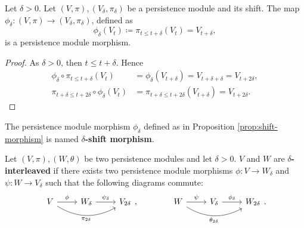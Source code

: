\begin{proposition} \label{prop:shift-morphism}
    Let $ \delta > 0 $. Let $(V, \pi), (V_\delta, \pi_\delta) $ be a persistence module and its shift. The map $ \phi_\delta \colon (V, \pi) \to (V_\delta, \pi_\delta) $, defined as
    \begin{equation}
        \phi_\delta (V_t) \coloneq \pi_{t \leq t + \delta}(V_t) = V_{t+\delta},
    \end{equation}
    is a persistence module morphism.
\end{proposition}
\begin{proof}
    As $ \delta > 0 $, then $ t \leq t+\delta $. Hence
    \begin{align}
        \phi_\delta \circ \pi_{t \leq t+\delta} (V_t) &= \phi_\delta (V_{t+\delta}) = V_{t+\delta+\delta} = V_{t+2 \delta}, \\
        \pi_{t+\delta \leq t+2\delta} \circ \phi_\delta (V_t) &= \pi_{t+\delta \leq t+2\delta}(V_{t+\delta}) = V_{t+2 \delta}.
    \end{align}
\end{proof}

\begin{definition}
    The persistence module morphism $ \phi_\delta $ defined as in Proposition \ref{prop:shift-morphism} is named {\bf $\delta$-shift morphism}.
\end{definition}

\begin{definition} \label{def:interleaved-modules}
    Let $ (V, \pi), (W, \theta) $ be two persistence modules and let $ \delta > 0 $. $ V $ and $ W $ are {\bf $\delta$-interleaved } if there exists two persistence module morphisms $ \phi \colon V \to W_\delta $ and $ \psi \colon W \to V_\delta $ such that the following diagrams commute:
    \begin{equation}
        \begin{array}{ccc}
        \begin{tikzcd}
            V \arrow[r, "\phi"] \arrow[rr, "\pi_{2\delta}"', bend right] & W_\delta \arrow[r, "\psi_\delta"] & V_{2\delta}
        \end{tikzcd},
        &
        \quad \quad
        &
        \begin{tikzcd}
            W \arrow[r, "\psi"] \arrow[rr, "\theta_{2\delta}"', bend right] & V_\delta \arrow[r, "\phi_\delta"] & W_{2\delta}
        \end{tikzcd}.
        \end{array}
    \end{equation}
\end{definition}

